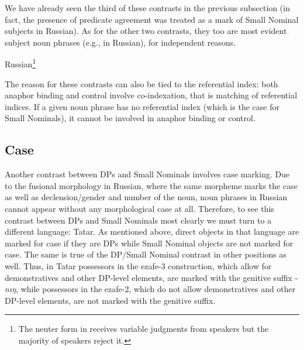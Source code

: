 \documentclass[output=paper]{langsci/langscibook}
\begin{document}
We have already seen the third of these contrasts in the previous subsection 
(in fact, the presence of predicate agreement was treated as a mark of Small Nominal subjects in Russian). 
As for the other two contrasts, they too are most evident subject noun phrases (e.g., in Russian), for independent reasons.\largerpage

\ea%
    \label{pereex:13}
    Russian\footnote{The neuter form in  receives variable judgments from speakers but the majority of speakers reject it.} 
    \z 
\z 

The reason for these contrasts can also be tied to the referential index: 
both anaphor binding and control involve co-indexation, that is matching of referential indices. 
If a given noun phrase has no referential index (which is the case for Small Nominals), it cannot be involved in anaphor binding or control.

\subsection{Case}  %

Another contrast between DPs and Small Nominals involves case marking. 
Due to the fusional morphology in Russian, where the same morpheme marks the case as well as declension/gender and number of the noun, 
noun phrases in Russian cannot appear without any morphological case at all. 
Therefore, to see this contrast between DPs and Small Nominals most clearly we must turn to a different language: Tatar. 
As mentioned above, direct objects in that language are marked for case if they are DPs while Small Nominal objects are not marked for case. 
The same is true of the DP/Small Nominal contrast in other positions as well. 
Thus, in Tatar possessors in the ezafe-3 construction, which allow for demonstratives and other DP-level elements, 
are marked with the genitive suffix -\textit{nıŋ}, 
while possessors in the ezafe-2, which do not allow demonstratives and other DP-level elements, are not marked with the genitive suffix.
\end{document}
